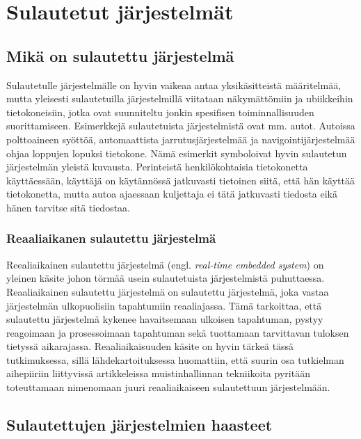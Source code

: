 \chapter{Sulautetut järjestelmät} \label{Kolmas luku}

\section{Mikä on sulautettu järjestelmä}

Sulautetulle järjestelmälle on hyvin vaikeaa antaa yksikäsitteistä määritelmää, mutta yleisesti sulautetuilla järjestelmillä viitataan näkymättömiin ja ubiikkeihin tietokoneisiin, jotka ovat suunniteltu jonkin spesifisen toiminnallisuuden suorittamiseen. Esimerkkejä sulautetuista järjestelmistä ovat mm. autot. Autoissa polttoaineen syöttöä, automaattista jarrutusjärjestelmää ja navigointijärjestelmää ohjaa loppujen lopuksi tietokone.\cite{rtcfes2015book} Nämä esimerkit symboloivat hyvin sulautetun järjestelmän yleistä kuvausta. Perinteistä henkilökohtaisia tietokonetta käyttäessään, käyttäjä on käytännössä jatkuvasti tietoinen siitä, että hän käyttää tietokonetta, mutta autoa ajaessaan kuljettaja ei tätä jatkuvasti tiedosta eikä hänen tarvitse sitä tiedostaa.

\subsection{Reaaliaikanen sulautettu järjestelmä}

Reealiaikainen sulautettu järjestelmä (engl. \textit{real-time embedded system}) on yleinen käsite johon törmää usein sulautetuista järjestelmistä puhuttaessa. Reaaliaikainen sulautettu järjestelmä on sulautettu järjestelmä, joka vastaa järjestelmän ulkopuolisiin tapahtumiin reaaliajassa. Tämä tarkoittaa, että sulautettu järjestelmä kykenee havaitsemaan ulkoisen tapahtuman, pystyy reagoimaan ja prosessoimaan tapahtuman sekä tuottamaan tarvittavan tuloksen tietyssä aikarajassa.\cite{rtcfes2015book} Reaaliaikaisuuden käsite on hyvin tärkeä tässä tutkimuksessa, sillä lähdekartoituksessa huomattiin, että suurin osa tutkielman aihepiiriin liittyvissä artikkeleissa muistinhallinnan tekniikoita pyritään toteuttamaan nimenomaan juuri reaaliaikaiseen sulautettuun järjestelmään.

\section{Sulautettujen järjestelmien haasteet} 

